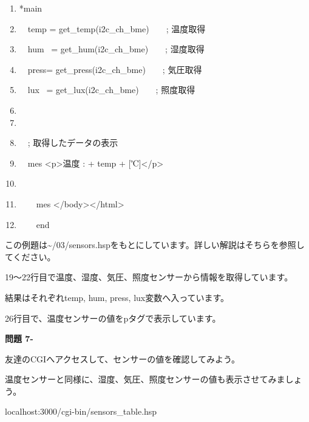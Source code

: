 \documentclass[a4paper,12pt,dvipdfmx]{jarticle}
\newcounter{Question}
\renewcommand\theQuestion{\textbf{問題 7-\arabic{Question}}}
\begin{document}
\begin{boxedminipage}{16.81cm}
\begin{enumerate}
	\item*main

	\item\ \ temp = get\_temp(i2c\_ch\_bme)\ \ \ \ ; 温度取得
	\item\ \ hum \ = get\_hum(i2c\_ch\_bme)\ \ \ \ ; 湿度取得
	\item\ \ press= get\_press(i2c\_ch\_bme)\ \ \ \ ; 気圧取得
	\item\ \ lux \ = get\_lux(i2c\_ch\_bme)\ \ \ \ ; 照度取得

	\item

	\item

	\item\ \ ; 取得したデータの表示

	\item\ \ mes {\textquotedbl}{\textless}p{\textgreater}温度 : {\textquotedbl} + temp + {\textquotedbl}
	[℃]{\textless}/p{\textgreater}{\textquotedbl}

	\item

	\item\ \ \ \ mes {\textquotedbl}{\textless}/body{\textgreater}{\textless}/html{\textgreater}{\textquotedbl}

	\item\ \ \ \ end
	\end{enumerate}
\end{boxedminipage}
\flushleft
この例題は{\textasciitilde}/03/sensors.hspをもとにしています。詳しい解説はそちらを参照してください。

19～22行目で温度、湿度、気圧、照度センサーから情報を取得しています。

結果はそれぞれtemp, hum, press,
lux変数へ入っています。

26行目で、温度センサーの値をpタグで表示しています。

\bigskip


\bigskip


\bigskip

\clearpage
{}\theQuestion\label{Q:sensors}

友達のCGIへアクセスして、センサーの値を確認してみよう。

温度センサーと同様に、湿度、気圧、照度センサーの値も表示させてみましょう。

\begin{center}
	\begin{boxedminipage}{0.5\textwidth}
		localhost:3000/cgi-bin/sensors\_table.hsp
	\end{boxedminipage}
\end{center}
\end{document}
